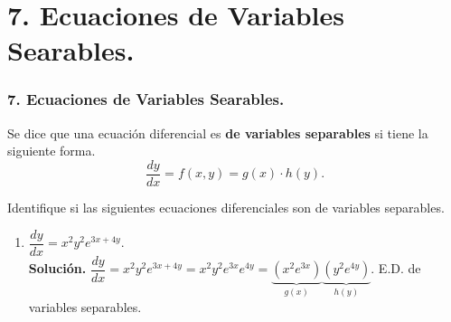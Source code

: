 \documentclass{beamer}
\begin{document}
\frame{\titlepage}

\section{7. Ecuaciones de Variables Searables.}

\begin{frame}[t]
	\frametitle{7. Ecuaciones de Variables Searables.}
	\vspace{-4mm}
	\begin{definition}
		Se dice que una ecuación diferencial es \textbf{de variables separables} si tiene la siguiente forma.
		\[
			\dfrac{dy}{dx} = f(x,y) = g(x) \cdot h(y).
		\]
	\end{definition}
	\begin{example}
		Identifique si las siguientes ecuaciones diferenciales son de variables separables.
		\begin{enumerate}
			\item \(\dfrac{dy}{dx} = x^2y^2e^{3x +4y}\). \\
				\textbf{Solución.} \(\dfrac{dy}{dx} =x^2y^2e^{3x+4y} =x^2y^2e^{3x} e^{4y} = \underbrace{(x^2e^{3x})} _{g(x)} \underbrace{(y^2e^{4y})}_{h(y)}\).
				E.D. de variables separables.
		\end{enumerate}
	\end{example}
\end{frame}
\end{document}
